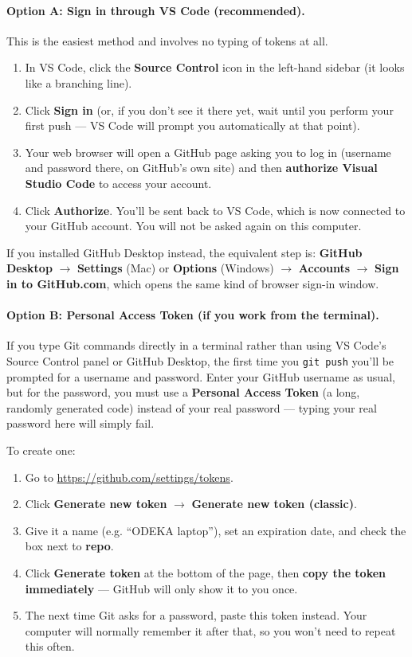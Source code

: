 \documentclass[11pt]{article}
\newcommand{\term}[1]{\textbf{#1}}
\newcommand{\cmd}[1]{\texttt{#1}}
\begin{document}
\paragraph{Option A: Sign in through VS Code (recommended).} This is the
easiest method and involves no typing of tokens at all.

\begin{enumerate}
    \item In VS Code, click the \textbf{Source Control} icon in the
    left-hand sidebar (it looks like a branching line).
    \item Click \textbf{Sign in} (or, if you don't see it there yet, wait
    until you perform your first push --- VS Code will prompt you
    automatically at that point).
    \item Your web browser will open a GitHub page asking you to log in
    (username and password there, on GitHub's own site) and then
    \term{authorize Visual Studio Code} to access your account.
    \item Click \textbf{Authorize}. You'll be sent back to VS Code, which
    is now connected to your GitHub account. You will not be asked again
    on this computer.
\end{enumerate}

If you installed GitHub Desktop instead, the equivalent step is:
\textbf{GitHub Desktop} $\to$ \textbf{Settings} (Mac) or \textbf{Options}
(Windows) $\to$ \textbf{Accounts} $\to$ \textbf{Sign in to GitHub.com},
which opens the same kind of browser sign-in window.

\paragraph{Option B: Personal Access Token (if you work from the terminal).}
If you type Git commands directly in a terminal rather than using VS
Code's Source Control panel or GitHub Desktop, the first time you
\cmd{git push} you'll be prompted for a username and password. Enter your
GitHub username as usual, but for the password, you must use a
\term{Personal Access Token} (a long, randomly generated code) instead of
your real password --- typing your real password here will simply fail.

To create one:

\begin{enumerate}
    \item Go to \url{https://github.com/settings/tokens}.
    \item Click \textbf{Generate new token} $\to$ \textbf{Generate new
    token (classic)}.
    \item Give it a name (e.g. ``ODEKA laptop''), set an expiration date,
    and check the box next to \textbf{repo}.
    \item Click \textbf{Generate token} at the bottom of the page, then
    \textbf{copy the token immediately} --- GitHub will only show it to
    you once.
    \item The next time Git asks for a password, paste this token instead.
    Your computer will normally remember it after that, so you won't need
    to repeat this often.
\end{enumerate}
\end{document}
